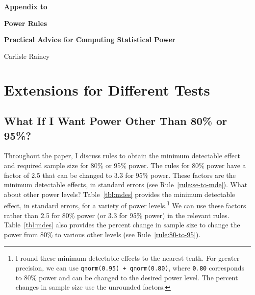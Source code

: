 \documentclass[12pt]{article}
\makeatletter
\renewcommand\appendix{\par
  \setcounter{section}{0}%
  \setcounter{subsection}{0}%
  \gdef\thesection{Appendix \@arabic\c@section}%
  \titleformat{\section}{\normalfont\sffamily\Large\bfseries}{\thesection.}{1em}{}%
}
\makeatother
\begin{document}
\begin{center}
{\Large \textbf{Appendix to}}

\vspace{0.4cm}

{\huge \textbf{Power Rules}}

\vspace{0.4cm}

{\Large\textbf{Practical Advice for Computing Statistical Power}}

\vspace{1cm}

Carlisle Rainey
\end{center}

\vspace{5mm}

\thispagestyle{empty}

\doublespace

\appendix
\setcounter{table}{2}

\section{Extensions for Different Tests}\label{app:tests}

\subsection*{What If I Want Power Other Than 80\% or 95\%?}

Throughout the paper, I discuss rules to obtain the minimum detectable effect and required sample size for 80\% or 95\% power.
The rules for 80\% power have a factor of 2.5 that can be changed to 3.3 for 95\% power.
These factors are the minimum detectable effects, in standard errors (see Rule~\ref{rule:se-to-mde}).
What about other power levels?
Table~\ref{tbl:mdes} provides the minimum detectable effect, in standard errors, for a variety of power levels.\footnote{I round these minimum detectable effects to the nearest tenth. For greater precision, we can use \texttt{qnorm(0.95) + qnorm(0.80)}, where \texttt{0.80} corresponds to 80\% power and can be changed to the desired power level. The percent changes in sample size use the unrounded factors.}
We can use these factors rather than 2.5 for 80\% power (or 3.3 for 95\% power) in the relevant rules.
Table~\ref{tbl:mdes} also provides the percent change in sample size to change the power from 80\% to various other levels (see Rule~\ref{rule:80-to-95}).
\end{document}
